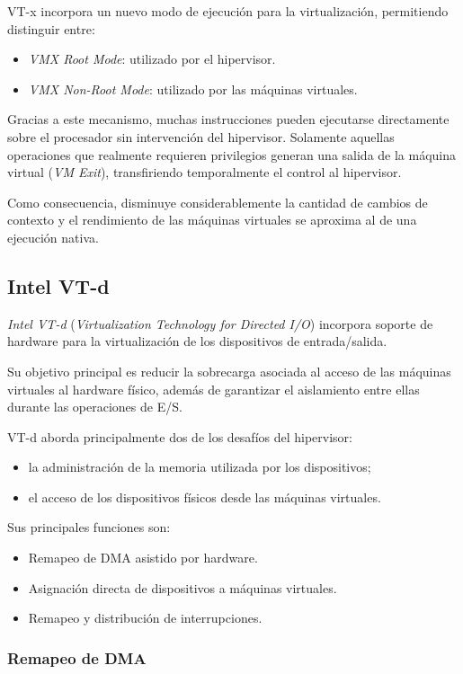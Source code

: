 VT-x incorpora un nuevo modo de ejecución para la virtualización, permitiendo distinguir entre:
\begin{itemize}
  \item \textit{VMX Root Mode}: utilizado por el hipervisor.
  \item \textit{VMX Non-Root Mode}: utilizado por las máquinas virtuales.
\end{itemize}
Gracias a este mecanismo, muchas instrucciones pueden ejecutarse directamente sobre el procesador sin intervención del hipervisor. Solamente aquellas operaciones que realmente requieren privilegios generan una salida de la máquina virtual (\textit{VM Exit}), transfiriendo temporalmente el control al hipervisor.

Como consecuencia, disminuye considerablemente la cantidad de cambios de contexto y el rendimiento de las máquinas virtuales se aproxima al de una ejecución nativa.

\subsection{Intel VT-d}

\textit{Intel VT-d} (\textit{Virtualization Technology for Directed I/O}) incorpora soporte de hardware para la virtualización de los dispositivos de entrada/salida.

Su objetivo principal es reducir la sobrecarga asociada al acceso de las máquinas virtuales al hardware físico, además de garantizar el aislamiento entre ellas durante las operaciones de E/S.

VT-d aborda principalmente dos de los desafíos del hipervisor:
\begin{itemize}
  \item la administración de la memoria utilizada por los dispositivos;
  \item el acceso de los dispositivos físicos desde las máquinas virtuales.
\end{itemize}
Sus principales funciones son:
\begin{itemize}
  \item Remapeo de DMA asistido por hardware.
  \item Asignación directa de dispositivos a máquinas virtuales.
  \item Remapeo y distribución de interrupciones.
\end{itemize}

\subsubsection{Remapeo de DMA}

